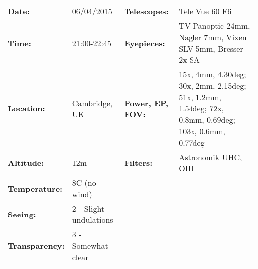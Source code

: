 \begin{tabular}{ p{0.9in} p{1.3in} p{1.2in} p{5.2in}}
{\bf Date:} & 06/04/2015 & {\bf Telescopes:} & Tele Vue 60 F6 \\ 
{\bf Time:} & 21:00-22:45 & {\bf Eyepieces:} & TV Panoptic 24mm, Nagler 7mm, Vixen SLV 5mm, Bresser 2x SA \\ 
{\bf Location:} & Cambridge, UK & {\bf Power, EP, FOV:} & 15x, 4mm, 4.30deg; 30x, 2mm, 2.15deg; 51x, 1.2mm, 1.54deg; 72x, 0.8mm, 0.69deg; 103x, 0.6mm, 0.77deg \\ 
{\bf Altitude:} & 12m & {\bf Filters:} & Astronomik UHC, OIII \\ 
{\bf Temperature:} & 8C (no wind) & & \\ 
{\bf Seeing:} & 2 - Slight undulations & & \\ 
{\bf Transparency:} & 3 - Somewhat clear & & \\ 
\end{tabular}
\centering 
